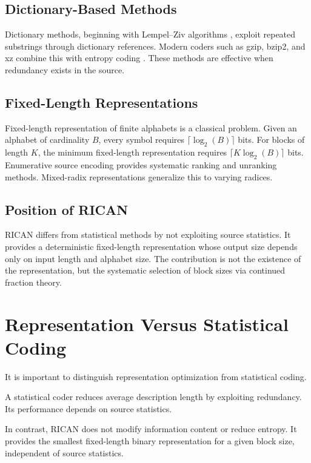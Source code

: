 \documentclass[10pt, onecolumn]{IEEEtran}
\begin{document}
\subsection{Dictionary-Based Methods}

Dictionary methods, beginning with Lempel--Ziv algorithms \cite{ziv}, exploit repeated substrings through dictionary references. Modern coders such as gzip, bzip2, and xz combine this with entropy coding \cite{sayood, salomon, nelson}. These methods are effective when redundancy exists in the source.

\subsection{Fixed-Length Representations}

Fixed-length representation of finite alphabets is a classical problem. Given an alphabet of cardinality $B$, every symbol requires $\lceil\log_2(B)\rceil$ bits. For blocks of length $K$, the minimum fixed-length representation requires $\lceil K\log_2(B)\rceil$ bits. Enumerative source encoding \cite{cover1973} provides systematic ranking and unranking methods. Mixed-radix representations \cite{knuth2} generalize this to varying radices.

\subsection{Position of RICAN}

RICAN differs from statistical methods by not exploiting source statistics. It provides a deterministic fixed-length representation whose output size depends only on input length and alphabet size. The contribution is not the existence of the representation, but the systematic selection of block sizes via continued fraction theory.

\section{Representation Versus Statistical Coding}

It is important to distinguish representation optimization from statistical coding.

A statistical coder reduces average description length by exploiting redundancy. Its performance depends on source statistics.

In contrast, RICAN does not modify information content or reduce entropy. It provides the smallest fixed-length binary representation for a given block size, independent of source statistics.
\end{document}
